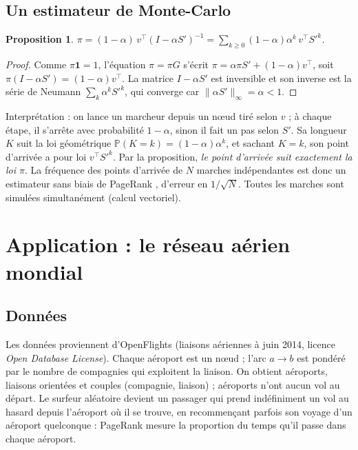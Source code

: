 \documentclass[11pt,a4paper]{article}
\newtheorem{proposition}{Proposition}
\theoremstyle{remark}
\newcommand{\1}{\mathbf{1}}
\newcommand{\PP}{\mathbb{P}}
\begin{document}
\subsection{Un estimateur de Monte-Carlo}\label{sec:mcpr}

\begin{proposition}
$\displaystyle \pi = (1-\alpha)\, v^\top (I - \alpha S')^{-1} = \sum_{k\ge0} (1-\alpha)\alpha^k\, v^\top S'^k$.
\end{proposition}

\begin{proof}
Comme $\pi\1 = 1$, l'équation $\pi = \pi G$ s'écrit $\pi = \alpha\pi S' + (1-\alpha) v^\top$, soit $\pi(I - \alpha S') = (1-\alpha)v^\top$. La matrice $I - \alpha S'$ est inversible et son inverse est la série de Neumann $\sum_k \alpha^k S'^k$, qui converge car $\lVert \alpha S'\rVert_\infty = \alpha < 1$.
\end{proof}

Interprétation : on lance un marcheur depuis un n\oe ud tiré selon $v$ ; à chaque étape, il s'arrête avec probabilité $1-\alpha$, sinon il fait un pas selon $S'$. Sa longueur $K$ suit la loi géométrique $\PP(K = k) = (1-\alpha)\alpha^k$, et sachant $K = k$, son point d'arrivée a pour loi $v^\top S'^k$. Par la proposition, \emph{le point d'arrivée suit exactement la loi $\pi$}. La fréquence des points d'arrivée de $N$ marches indépendantes est donc un estimateur sans biais de PageRank \cite{avrachenkov}, d'erreur en $1/\sqrt N$. Toutes les marches sont simulées simultanément (calcul vectoriel).

\section{Application : le réseau aérien mondial}

\subsection{Données}

Les données proviennent d'OpenFlights \cite{openflights} (liaisons aériennes à juin 2014, licence \emph{Open Database License}). Chaque aéroport est un n\oe ud ; l'arc $a \to b$ est pondéré par le nombre de compagnies qui exploitent la liaison. On obtient \nAirports{} aéroports, \nRoutes{} liaisons orientées et \nRouteEntries{} couples (compagnie, liaison) ; \nDangling{} aéroports n'ont aucun vol au départ. Le surfeur aléatoire devient un passager qui prend indéfiniment un vol au hasard depuis l'aéroport où il se trouve, en recommençant parfois son voyage d'un aéroport quelconque : PageRank mesure la proportion du temps qu'il passe dans chaque aéroport.
\end{document}
